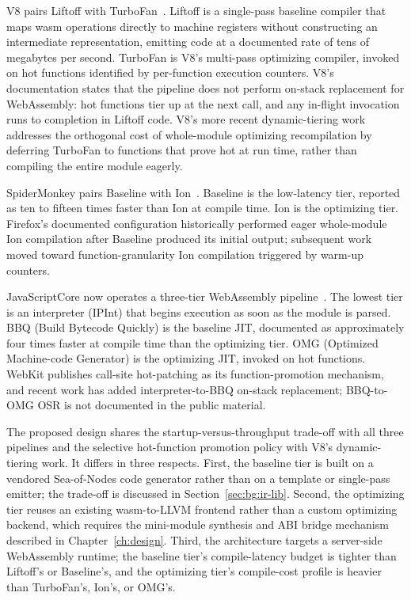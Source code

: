 V8 pairs Liftoff with TurboFan~\cite{v8-wasm}. Liftoff is a single-pass baseline compiler that maps wasm operations directly to machine registers without constructing an intermediate representation, emitting code at a documented rate of tens of megabytes per second. TurboFan is V8's multi-pass optimizing compiler, invoked on hot functions identified by per-function execution counters. V8's documentation states that the pipeline does not perform on-stack replacement for WebAssembly: hot functions tier up at the next call, and any in-flight invocation runs to completion in Liftoff code. V8's more recent dynamic-tiering work~\cite{v8-dynamic-tiering} addresses the orthogonal cost of whole-module optimizing recompilation by deferring TurboFan to functions that prove hot at run time, rather than compiling the entire module eagerly.

SpiderMonkey pairs Baseline with Ion~\cite{firefox-tiering}. Baseline is the low-latency tier, reported as ten to fifteen times faster than Ion at compile time. Ion is the optimizing tier. Firefox's documented configuration historically performed eager whole-module Ion compilation after Baseline produced its initial output; subsequent work moved toward function-granularity Ion compilation triggered by warm-up counters.

JavaScriptCore now operates a three-tier WebAssembly pipeline~\cite{webkit-wasm}. The lowest tier is an interpreter (IPInt) that begins execution as soon as the module is parsed. BBQ (Build Bytecode Quickly) is the baseline JIT, documented as approximately four times faster at compile time than the optimizing tier. OMG (Optimized Machine-code Generator) is the optimizing JIT, invoked on hot functions. WebKit publishes call-site hot-patching as its function-promotion mechanism, and recent work has added interpreter-to-BBQ on-stack replacement; BBQ-to-OMG OSR is not documented in the public material.

The proposed design shares the startup-versus-throughput trade-off with all three pipelines and the selective hot-function promotion policy with V8's dynamic-tiering work. It differs in three respects. First, the baseline tier is built on a vendored Sea-of-Nodes code generator rather than on a template or single-pass emitter; the trade-off is discussed in Section~\ref{sec:bg:ir-lib}. Second, the optimizing tier reuses an existing wasm-to-LLVM frontend rather than a custom optimizing backend, which requires the mini-module synthesis and ABI bridge mechanism described in Chapter~\ref{ch:design}. Third, the architecture targets a server-side WebAssembly runtime; the baseline tier's compile-latency budget is tighter than Liftoff's or Baseline's, and the optimizing tier's compile-cost profile is heavier than TurboFan's, Ion's, or OMG's.

